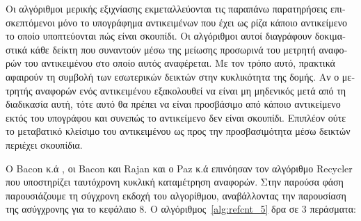 \begin{greek}
Οι αλγόριθμοι μερικής εξιχνίασης εκμεταλλεύονται τις παραπάνω
παρατηρήσεις επισκεπτόμενοι μόνο το υπογράφημα αντικειμένων
που έχει ως ρίζα κάποιο αντικείμενο το οποίο υποπτεύονται
πώς είναι σκουπίδι. Οι αλγόριθμοι αυτοί διαγράφουν δοκιμαστικά
κάθε δείκτη που συναντούν μέσω της μείωσης προσωρινά του
μετρητή αναφορών του αντικειμένου στο οποίο αυτός αναφέρεται.
Με τον τρόπο αυτό, πρακτικά αφαιρούν τη συμβολή των εσωτερικών
δεικτών στην κυκλικότητα της δομής. Αν ο μετρητής αναφορών ενός
αντικειμένου εξακολουθεί να είναι μη μηδενικός μετά από τη
διαδικασία αυτή, τότε αυτό θα πρέπει να είναι προσβάσιμο από
κάποιο αντικείμενο εκτός του υπογράφου και συνεπώς το αντικείμενο
δεν είναι σκουπίδι. Επιπλέον ούτε το μεταβατικό κλείσιμο του
αντικειμένου ως προς την προσβασιμότητα μέσω δεικτών περιέχει
σκουπίδια.

Ο Bacon κ.ά \cite{DBLP:conf/pldi/BaconALRS01}, οι Bacon
και Rajan \cite{DBLP:conf/ecoop/BaconR01} και ο Paz κ.ά
\cite{DBLP:journals/toplas/PazBKPR07} επινόησαν τον αλγόριθμο
Recycler που υποστηρίζει ταυτόχρονη κυκλική καταμέτρηση
αναφορών. Στην παρούσα φάση παρουσιάζουμε τη σύγχρονη εκδοχή
του αλγορίθμου, αναβάλλοντας την παρουσίαση της ασύγχρονης
για το κεφάλαιο 8. Ο αλγόριθμος~\ref{alg:refcnt_5} δρα σε
3 περάσματα:


\end{greek}
